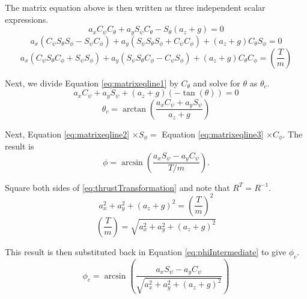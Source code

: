 The matrix equation above is then written as three independent scalar expressions.
\begin{equation}
    \label{eq:matrixeqline1}
    a_x C_{\psi} C_{\theta} + a_y S_{\psi} C_{\theta} - S_{\theta}( a_z + g ) = 0
\end{equation}
\begin{equation}
    \label{eq:matrixeqline2}
     a_x (C_{\psi} S_{\theta} S_{\phi} - S_{\psi} C_{\phi})
    + a_y (S_{\psi} S_{\theta} S_{\phi} + C_{\psi} C_{\phi})
    + ( a_z + g )C_{\theta} S_{\phi} = 0
\end{equation}
\begin{equation}
    \label{eq:matrixeqline3}
    a_x (C_{\psi} S_{\theta} C_{\phi} + S_{\psi}  S_{\phi})
    + a_y (S_{\psi} S_{\theta} C_{\phi} - C_{\psi}  S_{\phi})
    + ( a_z + g ) C_{\theta} C_{\phi} = \left(\frac{T}{m}\right)
\end{equation}

Next, we divide Equation \eqref{eq:matrixeqline1} by $C_{\theta}$ and solve for $\theta$ as $\theta_c$.
\begin{equation}
a_x C_{\psi} + a_y S_{\psi} + (a_z+g)(-\tan(\theta)) = 0
\end{equation}
\begin{equation}
    \label{eq:thetac}
    \theta_c = \arctan \left( \frac{a_x C_{\psi} + a_y S_{\psi}}{a_z+g} \right)
\end{equation}

Next,  Equation \eqref{eq:matrixeqline2} $\times  S_{\phi}  =$ Equation \eqref{eq:matrixeqline3} $\times C_{\phi} $. The result is
\begin{equation}
    \label{eq:phiIntermediate}
    \phi = \arcsin \left( \frac{a_x S_{\psi} - a_y C_{\psi}}{T/m} \right).
\end{equation}

Square both sides of \eqref{eq:thrustTransformation} and note that $ R^T = R^{-1}$.
\begin{equation}
a_x^2 + a_y^2 + (a_z + g)^2 = \left(\frac{T}{m}\right)^2
\end{equation}
\begin{equation}
\left(\frac{T}{m}\right) = \sqrt{a_x^2 + a_y^2 + (a_z + g)^2}
\end{equation}

This result is then substituted back in Equation \eqref{eq:phiIntermediate} to give $\phi_c$.
\begin{equation}
    \label{eq:phic}
    \phi_c = \arcsin\left( \frac{a_x S_{\psi} - a_y C_{\psi}}{\sqrt{a_x^2 + a_y^2 + (a_z + g)^2}} \right)
\end{equation}

